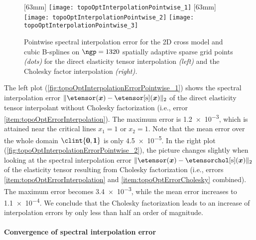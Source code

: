 \begin{figure}
  [63mm]{%
    \texttt{[image: topoOptInterpolationPointwise\_1]}%
  }%
  \hspace{3mm}%
  [63mm]{%
    \texttt{[image: topoOptInterpolationPointwise\_2]}%
  }%
  \hfill%
  \texttt{[image: topoOptInterpolationPointwise\_3]}%
  \caption[Pointwise spectral interpolation error for the 2D cross model]{%
    Pointwise spectral interpolation error for the 2D cross model and
    cubic B-splines on
    $\ngp = 1320$ spatially adaptive sparse grid points \emph{(dots)} for
    the direct elasticity tensor interpolation \emph{(left)} and
    the Cholesky factor interpolation \emph{(right).}%
  }%
  \label{fig:topoOptInterpolationErrorPointwise}%
\end{figure}

The left plot (\cref{fig:topoOptInterpolationErrorPointwise_1})
shows the spectral interpolation error
$\norm[2]{\etensor(\*x) - \etensorintp(\*x)}$
of the direct elasticity tensor interpolant without Cholesky factorization
(i.e., error \ref{item:topoOptErrorInterpolation}).
The maximum error is \num{1.2e-3},
which is attained near the critical lines $x_1 = 1$ or $x_2 = 1$.
Note that the mean error over the whole domain $\clint{\*0, \*1}$
is only \num{4.5e-5}.
In the right plot (\cref{fig:topoOptInterpolationErrorPointwise_2}),
the picture changes slightly when looking at the spectral interpolation error
$\norm[2]{\etensor(\*x) - \etensorcholintp(\*x)}$
of the elasticity tensor resulting from Cholesky factorization
(i.e., errors \ref{item:topoOptErrorInterpolation} and
\ref{item:topoOptErrorCholesky} combined).
The maximum error becomes \num{3.4e-3},
while the mean error increases to \num{1.1e-4}.
We conclude that the Cholesky factorization leads to an increase
of interpolation errors by only less than half an order of magnitude.

\paragraph{Convergence of spectral interpolation error}

